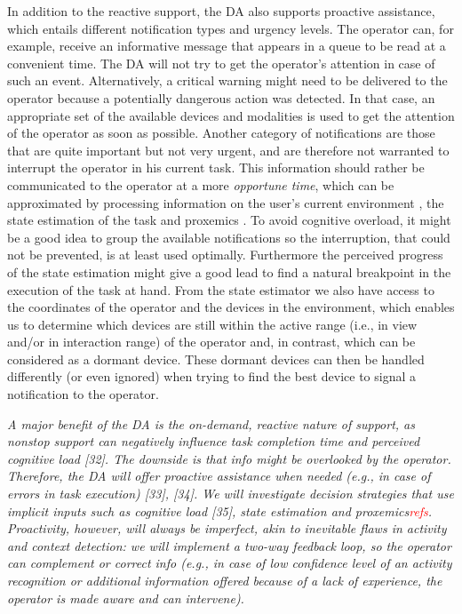In addition to the reactive support, the DA also supports proactive assistance, which entails different notification types and urgency levels. The operator can, for example, receive an informative message that appears in a queue to be read at a convenient time. The DA will not try to get the operator's attention in case of such an event. Alternatively, a critical warning might need to be delivered to the operator because a potentially dangerous action was detected. In that case, an appropriate set of the available devices and modalities is used to get the attention of the operator as soon as possible.
Another category of notifications are those that are quite important but not very urgent, and are therefore not warranted to interrupt the operator in his current task. This information should rather be communicated to the operator at a more \textit{opportune time}, which can be approximated by processing information on the user’s current environment \cite{lindlbauer2019ContextAwareOnlineAdaptation}, the state estimation of the task and proxemics \cite{Marquardt_2015} \cite{Williamson_2022}. 
To avoid cognitive overload, it might be a good idea to group the available notifications so the interruption, that could not be prevented, is at least used optimally.
Furthermore the perceived progress of the state estimation might give a good lead to find a natural breakpoint in the execution of the task at hand.
From the state estimator we also have access to the coordinates of the operator and the devices in the environment, which enables us to determine which devices are still within the active range (i.e., in view and/or in interaction range) of the operator and, in contrast, which can be considered as a dormant device. These dormant devices can then be handled differently (or even ignored) when trying to find the best device to signal a notification to the operator.

\iffalse
\textit{A major benefit of the DA is the on-demand, reactive nature of support, as nonstop support can negatively influence task completion time and perceived cognitive load [32]. The downside is that info might be overlooked by the operator. Therefore, the DA will offer proactive assistance when needed (e.g., in case of errors in task execution) [33], [34]. We will investigate decision strategies that use implicit inputs such as cognitive load [35], state estimation and proxemics\textcolor{red}{refs}. 
Proactivity, however, will always be imperfect, akin to inevitable flaws in activity and context detection: we will implement a two-way feedback loop, so the operator can complement or correct info (e.g., in case of low confidence level of an activity recognition or additional information offered because of a lack of experience, the operator is made aware and can intervene). }


